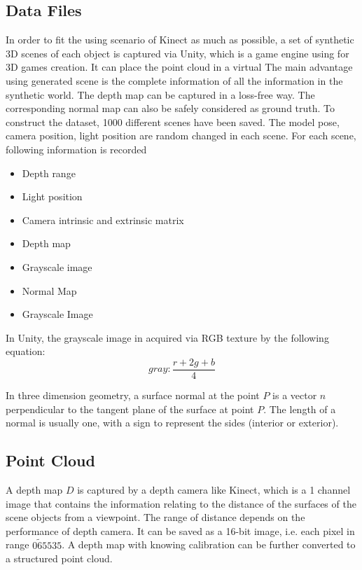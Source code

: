 \subsection{Data Files}
In order to fit the using scenario of Kinect as much as possible, a set of synthetic 3D scenes of each object is captured via Unity, which is a game engine using for 3D games creation. It can place the point cloud in a virtual   The main advantage using generated scene is the complete information of all the information in the synthetic world. The depth map can be captured in a loss-free way. The corresponding normal map can also be safely considered as ground truth. To construct the dataset, 1000 different scenes have been saved. The model pose, camera position, light position are random changed in each scene.
For each scene, following information is recorded
\begin{itemize}
	\item Depth range
	\item Light position
	\item Camera intrinsic and extrinsic matrix
	\item Depth map
	\item Grayscale image
	\item Normal Map	
\end{itemize}



\begin{itemize}
	\item Grayscale Image
\end{itemize}

In Unity, the grayscale image in acquired via RGB texture by the following equation:
\[ gray: \frac{r+2g+b}{4}  \]



\label{sec:surface-normal}
In three dimension geometry, a surface normal at the point $ P $ is a vector $ n $ perpendicular to the tangent plane of the surface at point $ P $. The length of a normal is usually one, with a sign to represent the sides (interior or exterior).%


\subsection{Point Cloud}
\label{sec:depth-map-to-point-cloud}

A depth map $ D $ is captured by a depth camera like Kinect, which is a 1 channel image that contains the information relating to the distance of the surfaces of the scene objects from a viewpoint. The range of distance depends on the performance of depth camera. It can be saved as a 16-bit image, i.e. each pixel in range $0 \tilde 65535$. A depth map with knowing calibration can be further converted to a structured point cloud. 


